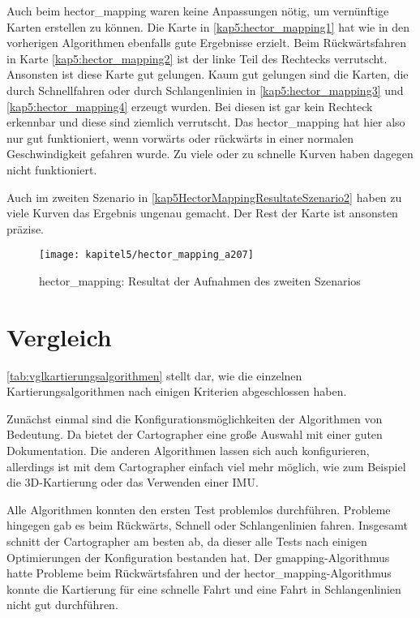 Auch beim hector\_mapping waren keine Anpassungen nötig, um vernünftige Karten erstellen zu können. Die Karte in \autoref{kap5:hector_mapping1} hat wie in den vorherigen Algorithmen ebenfalls gute Ergebnisse erzielt. Beim Rückwärtsfahren in Karte \autoref{kap5:hector_mapping2} ist der linke Teil des Rechtecks verrutscht. Ansonsten ist diese Karte gut gelungen. Kaum gut gelungen sind die Karten, die durch Schnellfahren oder durch Schlangenlinien in \autoref{kap5:hector_mapping3} und \autoref{kap5:hector_mapping4} erzeugt wurden. Bei diesen ist gar kein Rechteck erkennbar und diese sind ziemlich verrutscht. Das hector\_mapping hat hier also nur gut funktioniert, wenn vorwärts oder rückwärts in einer normalen Geschwindigkeit gefahren wurde. Zu viele oder zu schnelle Kurven haben dagegen nicht funktioniert.

Auch im zweiten Szenario in \autoref{kap5HectorMappingResultateSzenario2} haben zu viele Kurven das Ergebnis ungenau gemacht. Der Rest der Karte ist ansonsten präzise.

\begin{figure}[b]
  \centering
  \texttt{[image: kapitel5/hector\_mapping\_a207]}
  \caption{hector\_mapping: Resultat der Aufnahmen des zweiten Szenarios}
  \label{kap5HectorMappingResultateSzenario2}
\end{figure}

\section{Vergleich}

\autoref{tab:vglkartierungsalgorithmen} stellt dar, wie die einzelnen Kartierungsalgorithmen nach einigen Kriterien abgeschlossen haben. 

Zunächst einmal sind die Konfigurationsmöglichkeiten der Algorithmen von Bedeutung. Da bietet der Cartographer eine große Auswahl mit einer guten Dokumentation. Die anderen Algorithmen lassen sich auch konfigurieren, allerdings ist mit dem Cartographer einfach viel mehr möglich, wie zum Beispiel die 3D-Kartierung oder das Verwenden einer \ac{IMU}.

Alle Algorithmen konnten den ersten Test problemlos durchführen. Probleme hingegen gab es beim Rückwärts, Schnell oder Schlangenlinien fahren. Insgesamt schnitt der Cartographer am besten ab, da dieser alle Tests nach einigen Optimierungen der Konfiguration bestanden hat. Der gmapping-Algorithmus hatte Probleme beim Rückwärtsfahren und der hector\_mapping-Algorithmus konnte die Kartierung für eine schnelle Fahrt und eine Fahrt in Schlangenlinien nicht gut durchführen.

